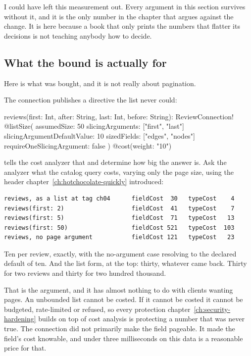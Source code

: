 I could have left this measurement out. Every argument in this section survives
without it, and it is the only number in the chapter that argues against the
change. It is here because a book that only prints the numbers that flatter its
decisions is not teaching anybody how to decide.

\subsection*{What the bound is actually for}

%
Here is what was bought, and it is not really about pagination.

The connection publishes a directive the list never could:

\begin{graphqlsdl}
reviews(first: Int, after: String, last: Int, before: String): ReviewConnection!
  @listSize(
    assumedSize: 50
    slicingArguments: ["first", "last"]
    slicingArgumentDefaultValue: 10
    sizedFields: ["edges", "nodes"]
    requireOneSlicingArgument: false
  )
  @cost(weight: "10")
\end{graphqlsdl}

 tells the cost analyzer that  and
 determine how big the answer is. Ask the analyzer what the catalog
query costs, varying only the page size, using the header
chapter~\ref{ch:hotchocolate-quickly} introduced:

\begin{verbatim}
reviews, as a list at tag ch04      fieldCost  30   typeCost    4
reviews(first: 2)                   fieldCost  41   typeCost    7
reviews(first: 5)                   fieldCost  71   typeCost   13
reviews(first: 50)                  fieldCost 521   typeCost  103
reviews, no page argument           fieldCost 121   typeCost   23
\end{verbatim}

Ten per review, exactly, with the no-argument case resolving to the declared
default of ten. And the list form, at the top: thirty, whatever came back.
Thirty for two reviews and thirty for two hundred thousand.

%
That is the argument, and it has almost nothing to do with clients wanting pages.
An unbounded list cannot be costed. If it cannot be costed it cannot be
budgeted, rate-limited or refused, so every protection
chapter~\ref{ch:security-hardening} builds on top of cost analysis is
protecting a number that was never true. The connection did not primarily make
the field pageable. It made the field's cost knowable, and under three
milliseconds on this data is a reasonable price for that.

